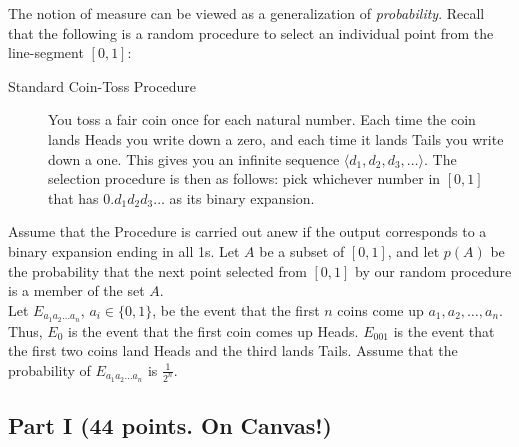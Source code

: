 \documentclass[12pt,letterpaper]{article}
\begin{document}
The notion of measure can be viewed as a generalization of \emph{probability}. Recall that the following is a random procedure to select an individual point from the line-segment $[0,1]$:
\begin{description}
\item[Standard Coin-Toss Procedure] You toss a fair coin once for each natural number. Each time the coin lands Heads you write down a zero, and each time it lands Tails you write down a one. This gives you an infinite sequence $\langle d_{1},d_{2},d_{3},\ldots\rangle$. The selection procedure is then as follows: pick whichever number in $[0,1]$ that has $0.d_{1}d_{2}d_{3}\ldots$ as its binary expansion.
\end{description}
Assume that the Procedure is carried out anew if the output corresponds to a binary expansion ending in all 1s. Let $A$ be a subset of $[0,1]$, and let $p(A)$ be the probability that the next point selected from $[0,1]$ by our random procedure is a member of the set $A$. \\

\noindent
Let $E_{a_{1}a_{2}\ldots a_{n}}$, $a_{i}\in\{0,1\}$, be the event that the first $n$ coins come up $a_{1},a_{2},\ldots,a_{n}$. Thus, $E_{0}$ is the event that the first coin comes up Heads. $E_{001}$ is the event that the first two coins land Heads and the third lands Tails. Assume that the probability of $E_{a_{1}a_{2}\ldots a_{n}}$ is $\frac{1}{2^{n}}$. 


\clearpage

\subsection*{Part I (44 points. On Canvas!)} 
\end{document}
